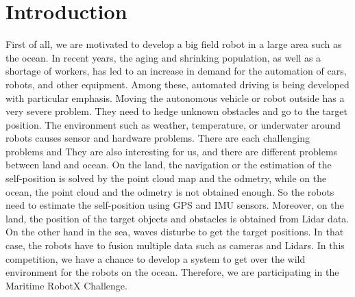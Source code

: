 \documentclass[lettersize,journal]{IEEEtran}
\begin{document}
\section{Introduction}
First of all, we are motivated to develop a big field robot in a large area such as the ocean.
In recent years, the aging and shrinking population, as well as a shortage of workers,
has led to an increase in demand for the automation of cars, robots, and other equipment.
Among these, automated driving is being developed with particular emphasis.
Moving the autonomous vehicle or robot outside has a very severe problem.
They need to hedge unknown obstacles and go to the target position.
The environment such as weather, temperature, or underwater around robots causes sensor and hardware problems.
There are each challenging problems and They are also interesting for us, and there are different problems between land and ocean.
On the land, the navigation or the estimation of the self-position is solved by the point cloud map and the odmetry,
while on the ocean, the point cloud and the odmetry is not obtained enough. So the robots need to estimate the self-position using GPS and IMU sensors.
Moreover, on the land, the position of the target objects and obstacles is obtained from Lidar data. On the other hand in the sea,
waves disturbe to get the target positions. In that case, the robots have to fusion multiple data such as cameras and Lidars.
In this competition, we have a chance to develop a system to get over the wild environment 
for the robots on the ocean. Therefore, we are participating in the Maritime RobotX Challenge.
\end{document}
